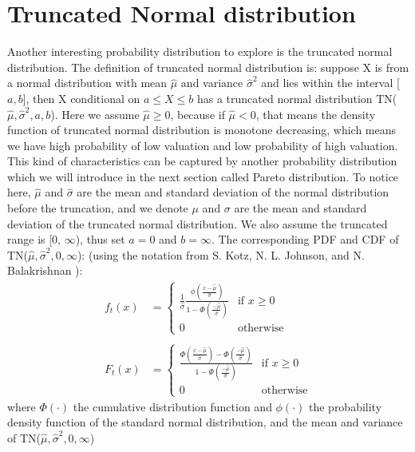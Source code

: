 \section{Truncated Normal distribution} \label{Normal distribution} 
Another interesting probability distribution to explore is the truncated normal distribution. The definition of truncated normal distribution is: suppose X is from a normal distribution with mean $\hat{\mu}$ and variance $\hat{\sigma}^2$ and lies within the interval [$a,b$], then X conditional on $a \leqslant X  \leqslant b$ has a truncated normal distribution TN($\hat{\mu}, \hat{\sigma}^2, a,b$). Here we assume $\hat{\mu} \geqslant0 $, because if $\hat{\mu} <0$, that means the density function of truncated normal distribution is monotone decreasing, which means we have high probability of low valuation and low probability of high valuation. This kind of characteristics can be captured by another probability distribution which we will introduce in the next section called Pareto distribution. To notice here, $\hat{\mu}$ and $\hat{\sigma}$ are the mean and standard deviation of the normal distribution before the truncation, and we denote $\mu$ and $\sigma$ are the mean and standard deviation of the truncated normal distribution. We also assume the truncated range is [0, $\infty$), thus set $a = 0$ and $b = \infty$. The corresponding PDF and CDF of TN($\hat{\mu}, \hat{\sigma}^2, 0,\infty$): (using the notation from S. Kotz, N. L. Johnson, and N. Balakrishnan \cite{kotz1994continuous}):
\begin{align*}
	f_t(x) &=\begin{cases}
			\frac{1}{\hat{\sigma}} \frac{\phi(\frac{x- \hat{\mu}}{\hat{\sigma}})}{1 - \Phi(\frac{- \hat{\mu}}{\hat{\sigma}})}  & \text{if }  x \geqslant 0 \\ 0 & \text{otherwise}
			\end{cases}\\ \\
	F_t(x) &= \begin{cases}	
			\frac{\Phi(\frac{x- \hat{\mu}}{\hat{\sigma}}) - \Phi(\frac{- \hat{\mu}}{\hat{\sigma}})}{1 - \Phi(\frac{- \hat{\mu}}{\hat{\sigma}})}  & \text{if } x \geqslant 0 \\ 0 & \text{otherwise}
			\end{cases} 
\end{align*}
where $\Phi(\cdot)$ the cumulative distribution function and $\phi(\cdot)$ the probability density function of the standard normal distribution, and the mean and variance of TN($\hat{\mu}, \hat{\sigma}^2, 0,\infty$)
